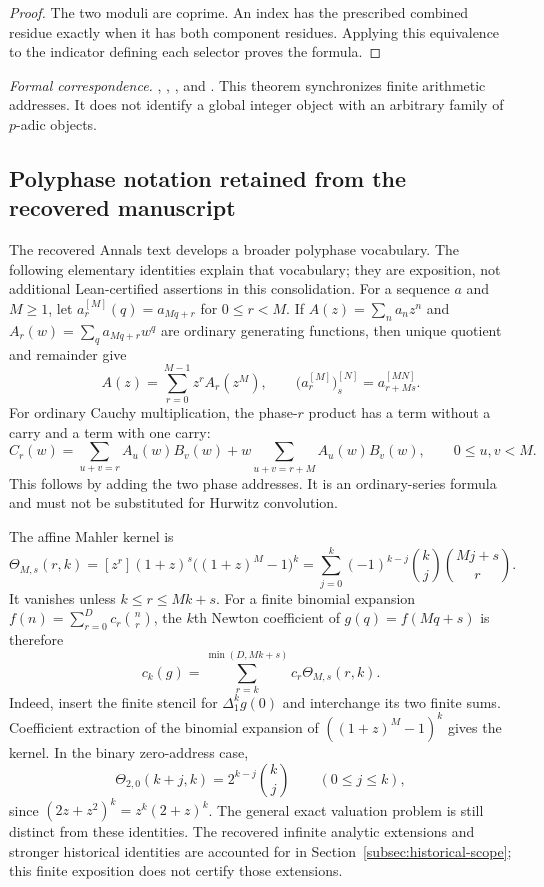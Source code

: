 \begin{proof}
The two moduli are coprime. An index has the prescribed combined residue
exactly when it has both component residues. Applying this equivalence to
the indicator defining each selector proves the formula.
\end{proof}

\begingroup\small\raggedright
\noindent\emph{Formal correspondence.}
, ,
, and
.
This theorem synchronizes finite arithmetic addresses. It does not identify a
global integer object with an arbitrary family of $p$-adic objects.
\par\endgroup

\subsection{Polyphase notation retained from the recovered manuscript}
\label{subsec:polyphase-exposition}

The recovered Annals text develops a broader polyphase vocabulary. The
following elementary identities explain that vocabulary; they are exposition,
not additional Lean-certified assertions in this consolidation.
For a sequence $a$ and $M\geq1$, let $a_r^{[M]}(q)=a_{Mq+r}$ for $0\leq r<M$.
If $A(z)=\sum_n a_nz^n$ and $A_r(w)=\sum_q a_{Mq+r}w^q$ are ordinary generating
functions, then unique quotient and remainder give
\[
A(z)=\sum_{r=0}^{M-1}z^rA_r(z^M),\qquad
\bigl(a_r^{[M]}\bigr)_s^{[N]}=a_{r+Ms}^{[MN]}.
\]
For ordinary Cauchy multiplication, the phase-$r$ product has a term without a
carry and a term with one carry:
\[
C_r(w)=\sum_{u+v=r}A_u(w)B_v(w)
+w\sum_{u+v=r+M}A_u(w)B_v(w),\qquad 0\leq u,v<M.
\]
This follows by adding the two phase addresses. It is an ordinary-series
formula and must not be substituted for Hurwitz convolution.

The affine Mahler kernel is
\[
\Theta_{M,s}(r,k)=[z^r](1+z)^s\bigl((1+z)^M-1\bigr)^k
=\sum_{j=0}^{k}(-1)^{k-j}\binom kj\binom{Mj+s}{r}.
\]
It vanishes unless $k\leq r\leq Mk+s$. For a finite binomial expansion
$f(n)=\sum_{r=0}^{D}c_r\binom nr$, the $k$th Newton coefficient of
$g(q)=f(Mq+s)$ is therefore
\[
c_k(g)=\sum_{r=k}^{\min(D,Mk+s)}c_r\Theta_{M,s}(r,k).
\]
Indeed, insert the finite stencil for $\Delta_1^k g(0)$ and interchange its
two finite sums. Coefficient extraction of the binomial expansion of
$((1+z)^M-1)^k$ gives the kernel. In the binary zero-address case,
\[
\Theta_{2,0}(k+j,k)=2^{k-j}\binom kj\qquad(0\leq j\leq k),
\]
since $(2z+z^2)^k=z^k(2+z)^k$.
The general exact valuation problem is still distinct from these identities.
The recovered infinite analytic extensions and stronger historical identities
are accounted for in Section~\ref{subsec:historical-scope}; this finite
exposition does not certify those extensions.
